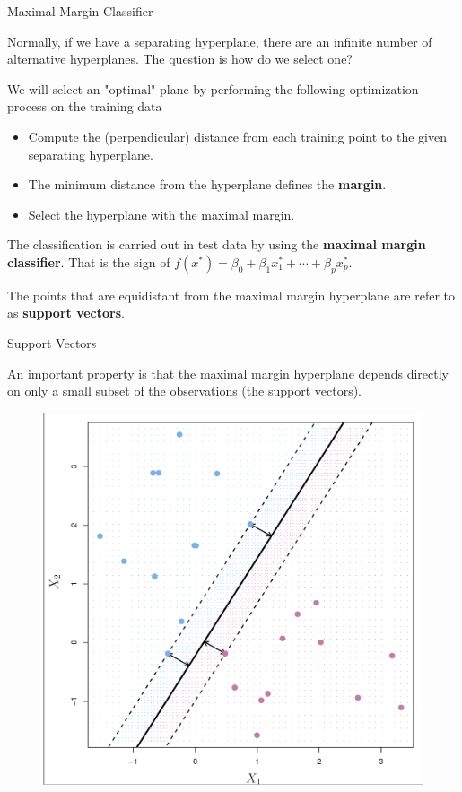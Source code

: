 \documentclass{beamer}
\begin{document}
\begin{frame}{Maximal Margin Classifier}
	
	Normally, if we have a separating hyperplane, there are an infinite number of alternative hyperplanes. The question is how do we select one?
	
	We will select an "optimal" plane by performing the following optimization process on the training data
	
	\begin{itemize}
		\item Compute the (perpendicular) distance from each training point to the given separating hyperplane.
		\item The minimum distance from the hyperplane defines the {\bf margin}.
		\item Select the hyperplane with the maximal margin.
	\end{itemize}
	The classification is carried out in test data by using the {\bf maximal margin classifier}. That is the sign of $f(x^*)= \beta_0 + \beta_1 x_1^* + \cdots + \beta_p x_p^*$. 
	
	The points that are equidistant from the maximal margin hyperplane are refer to as {\bf support vectors}. 
\end{frame}

\begin{frame}{Support Vectors}
	
	An important property is that the maximal margin hyperplane depends directly on only a small subset of the observations (the support vectors).
	
		\begin{figure}[h]
		\centering
		\includegraphics[scale=0.35]{../../Figures/fig_support_vectors.png}
	\end{figure}
	
	
\end{frame}
\end{document}
